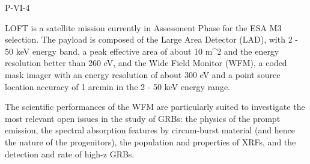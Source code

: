 P-VI-4


\bigskip



\bigskip

\noindent LOFT is a satellite mission currently in Assessment Phase for the
ESA M3 selection. The payload is composed of the Large Area
Detector (LAD), with 2 - 50 keV energy band, a peak effective area
of about 10 m^2 and the energy resolution better than 260 eV, and
the Wide Field Monitor (WFM), a coded mask imager with an energy
resolution of about 300 eV and a point source location accuracy of
1 arcmin in the 2 - 50 keV energy range.

The scientific performances of the WFM are particularly suited to
investigate the most relevant open issues in the study of GRBs: the
physics of the prompt emission, the spectral absorption features by
circum-burst material (and hence the nature of the progenitors),
the population and properties of XRFs, and the detection and rate of high-z GRBs.

